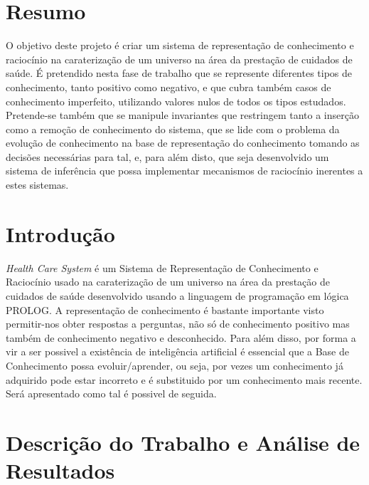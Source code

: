 \documentclass{article}
\begin{document}
\section{Resumo}
O objetivo deste projeto é criar um sistema de representação de conhecimento e raciocínio na caraterização de um universo na área da prestação de cuidados de saúde. É pretendido nesta fase de trabalho que se represente diferentes tipos de conhecimento, tanto positivo como negativo, e que cubra também casos de conhecimento imperfeito, utilizando valores nulos de todos os tipos estudados. Pretende-se também que se manipule invariantes que restringem tanto a inserção como a remoção de conhecimento do sistema, que se lide com o problema da evolução de conhecimento na base de representação do conhecimento tomando as decisões necessárias para tal, e, para além disto, que seja desenvolvido um sistema de inferência que  possa implementar mecanismos de raciocínio inerentes a estes sistemas.
\vspace*{\fill}

\newpage

\vspace*{\fill}
\tableofcontents
\vspace*{\fill}

\newpage

\vspace*{\fill}
\section{Introdução}
\textit{Health Care System} é um Sistema de Representação de Conhecimento e Raciocínio usado na caraterização de um universo na área da prestação de cuidados de saúde desenvolvido usando a linguagem de programação em lógica PROLOG. A representação de conhecimento é bastante importante visto permitir-nos obter respostas a perguntas, não só de conhecimento positivo mas também de conhecimento negativo e desconhecido. Para além disso, por forma a vir a ser possivel a existência de inteligência artificial é essencial que a Base de Conhecimento possa evoluir/aprender, ou seja, por vezes um conhecimento já adquirido pode estar incorreto e é substituido por um conhecimento mais recente. Será apresentado como tal é possivel de seguida. 
\vspace*{\fill}

\newpage

\section{Descrição do Trabalho e Análise de Resultados}
\end{document}
